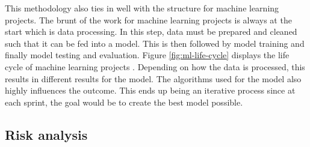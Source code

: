 \documentclass[11pt]{article}
\begin{document}
This methodology also ties in well with the structure for machine learning projects. The brunt of the work for machine learning projects is always at the start which is data processing. In this step, data must be prepared and cleaned such that it can be fed into a model. This is then followed by model training and finally model testing and evaluation. Figure \ref{fig:ml-life-cycle} displays the life cycle of machine learning projects \cite{methodology-ml-life-cycle}. Depending on how the data is processed, this results in different results for the model. The algorithms used for the model also highly influences the outcome. This ends up being an iterative process since at each sprint, the goal would be to create the best model possible. 

\subsection{Risk analysis}
\end{document}

